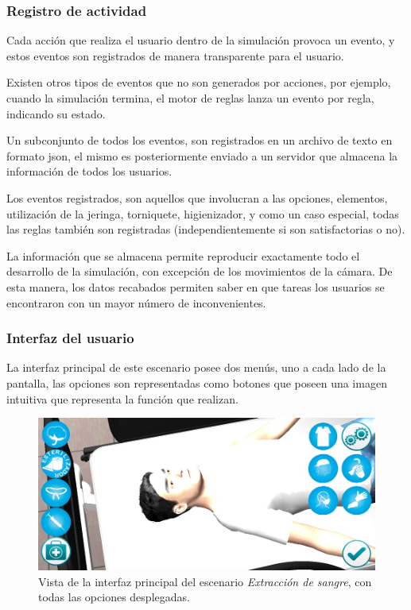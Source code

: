\subsubsection{Registro de actividad}

Cada acción que realiza el usuario dentro de la simulación provoca un evento, y
estos eventos son registrados de manera transparente para el usuario.

Existen otros tipos de eventos que no son generados por acciones, por ejemplo,
cuando la simulación termina, el motor de reglas lanza un evento por regla,
indicando su estado.

Un subconjunto de todos los eventos, son registrados en un archivo de texto en
formato \Gls{json}, el mismo es posteriormente enviado a un servidor que
almacena la información de todos los usuarios.

Los eventos registrados, son aquellos que involucran a las opciones, elementos,
utilización de la jeringa, torniquete, higienizador, y como un caso especial,
todas las reglas también son registradas (independientemente si son
satisfactorias o no).

La información que se almacena permite reproducir exactamente todo el desarrollo
de la simulación, con excepción de los movimientos de la cámara. De esta manera,
los datos recabados permiten saber en que tareas los usuarios se encontraron con
un mayor número de inconvenientes.

\subsubsection{Interfaz del usuario}

La interfaz principal de este escenario posee dos menús, uno a cada lado de la
pantalla, las opciones son representadas como botones que poseen una imagen
intuitiva que representa la
función que realizan. 

\begin{figure}
\centering
\includegraphics[scale=0.5]{propuesta/hemocultivo_gui.jpg}
\caption{Vista de la interfaz principal del escenario \emph{Extracción de
        sangre}, con todas las opciones desplegadas.}
\label{fig:hemocultivo_gui}
\end{figure}


